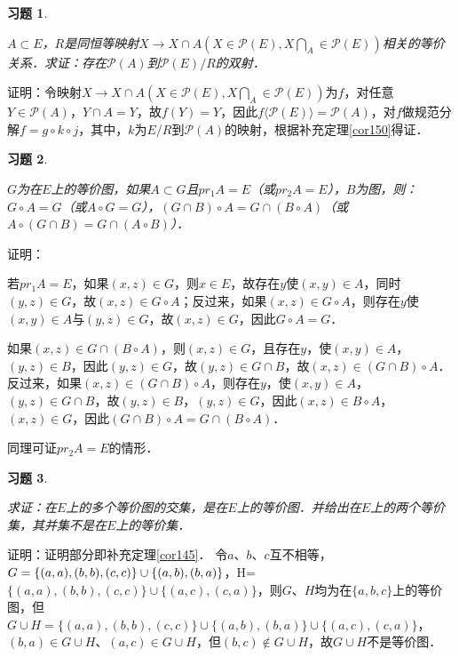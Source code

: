 \documentclass[12pt, a4paper, oneside]{book}
\newtheorem{exer}{习题}
\begin{document}
			\begin{exer}\label{exer69}
				\hfill\par
				$A\subset E$，$R$是同恒等映射$X\to X\cap A(X\in \mathcal{P}(E), X\bigcap\limits_A\in \mathcal{P}(E))$相关的等价关系．求证：存在$\mathcal{P}(A)$到$\mathcal{P}(E)/R$的双射．
			\end{exer}
			证明：令映射$X\to X\cap A(X\in \mathcal{P}(E), X\bigcap\limits_A\in \mathcal{P}(E))$为$f$，对任意$Y\in \mathcal{P}(A)$，$Y\cap A=Y$，故$f(Y)=Y$，因此$f\langle\mathcal{P}(E)\rangle=\mathcal{P}(A)$，对$f$做规范分解$f=g\circ k\circ j$，其中，$k$为$E/R$到$\mathcal{P}(A)$的映射，根据补充定理\ref{cor150}得证．
			
			\begin{exer}\label{exer70}
				\hfill\par
				$G$为在$E$上的等价图，如果$A\subset G$且$pr_1A=E$（或$pr_2A=E$），$B$为图，则：$G\circ A=G$（或$A\circ G=G$），$(G\cap B)\circ A=G\cap(B\circ A)$（或$A\circ (G\cap B)=G\cap(A\circ B)$）．
			\end{exer}
			证明：
			\par
			若$pr_1A=E$，如果$(x, z)\in G$，则$x\in E$，故存在$y$使$(x, y)\in A$，同时$(y, z)\in G$，故$(x, z)\in G\circ A$；反过来，如果$(x, z)\in G\circ A$，则存在$y$使$(x, y)\in A\text{与}(y, z)\in G$，故$(x, z) \in G$，因此$G\circ A=G$．
			\par
			如果$(x, z)\in G\cap(B\circ A)$，则$(x, z)\in G$，且存在$y$，使$(x, y)\in A$，$(y, z)\in B$，因此$(y, z)\in G$，故$(y, z)\in G\cap B$，故$(x, z)\in (G\cap B)\circ A$．反过来，如果$(x, z)\in (G\cap B)\circ A$，则存在$y$，使$(x, y)\in A$，$(y, z)\in G\cap B$，故$(y, z)\in B$，$(y, z)\in G$，因此$(x, z)\in B\circ A$，$(x, z)\in G$，因此$(G\cap B)\circ A=G\cap(B\circ A)$．
			\par
			同理可证$pr_2A=E$的情形．
			
			\begin{exer}\label{exer71}
				\hfill\par
				求证：在$E$上的多个等价图的交集，是在$E$上的等价图．并给出在$E$上的两个等价集，其并集不是在$E$上的等价集．
			\end{exer}
			证明：证明部分即补充定理\ref{cor145}．
			令$a$、$b$、$c$互不相等，$G=\\\{(a, a), (b, b), (c, c)\}\cup\{(a, b), (b, a)\}$，H=$\{(a, a), (b, b), (c, c)\}\cup\{(a, c), (c, a)\}$，则$G$、$H$均为在$\{a, b, c\}$上的等价图，但$G\cup H=\{(a, a), (b, b), (c, c)\}\cup\{(a, b), (b, a)\}\cup\{(a, c), (c, a)\}$，$(b, a)\in G\cup H$、$(a, c)\in G\cup H$，但$(b, c)\notin G\cup H$，故$G\cup H$不是等价图．
			
\end{document}
